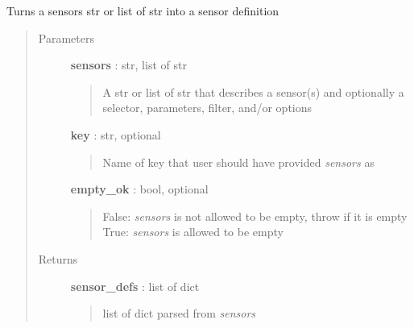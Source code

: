 \documentclass[letterpaper,10pt,english]{sphinxmanual}
\begin{document}
\begin{fulllineitems}
\label{pytan.utils:pytan.utils.dehumanize_sensors}
Turns a sensors str or list of str into a sensor definition
\begin{quote}\begin{description}
\item[{Parameters}] \leavevmode
\textbf{sensors} : str, list of str
\begin{quote}

A str or list of str that describes a sensor(s) and optionally a selector, parameters, filter, and/or options
\end{quote}

\textbf{key} : str, optional
\begin{quote}

Name of key that user should have provided \emph{sensors} as
\end{quote}

\textbf{empty\_ok} : bool, optional
\begin{quote}

False: \emph{sensors} is not allowed to be empty, throw {\hyperref[pytan.utils:pytan.utils.HumanParserError]{}} if it is empty
True: \emph{sensors} is allowed to be empty
\end{quote}

\item[{Returns}] \leavevmode
\textbf{sensor\_defs} : list of dict
\begin{quote}

list of dict parsed from \emph{sensors}
\end{quote}

\end{description}\end{quote}

\end{fulllineitems}

\end{document}
